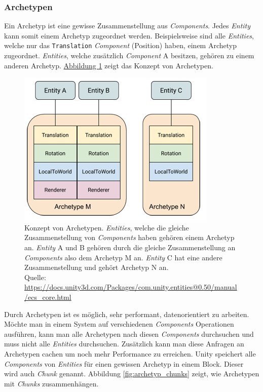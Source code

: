 \subsubsection[Archetypen]{Archetypen}
Ein Archetyp ist eine gewisse Zusammenstellung aus \textit{Components}. Jedes \textit{Entity} kann somit einem Archetyp zugeordnet werden. Beispielsweise sind alle \textit{Entities}, welche nur das \texttt{Translation} \textit{Component} (Position) haben, einem Archetyp zugeordnet. \textit{Entities}, welche zusätzlich \textit{Component} A besitzen, gehören zu einem anderen Archetyp. \hyperref[fig:archetype_concept]{Abbildung \ref*{fig:archetype_concept}} zeigt das Konzept von Archetypen.
\begin{figure}[H]
\begin{center}
\includegraphics[scale=0.66]{Bilder/ArchetypeConcept.png}
\caption[Konzept von Archetypen]{Konzept von Archetypen. \textit{Entities}, welche die gleiche Zusammenstellung von \textit{Components} haben gehören einem Archetyp an. \textit{Entity} A und B gehören durch die gleiche Zusammenstellung an \textit{Components} also dem Archetyp M an. \textit{Entity} C hat eine andere Zusammenstellung und gehört Archetyp N an.\\
\footnotesize{Quelle: \url{https://docs.unity3d.com/Packages/com.unity.entities@0.50/manual/ecs_core.html}}}
\label{fig:archetype_concept}
\end{center}
\end{figure}
Durch Archetypen ist es möglich, sehr performant, datenorientiert zu arbeiten. Möchte man in einem System auf verschiedenen \textit{Components} Operationen ausführen, kann man alle Archetypen nach diesen \textit{Components} durchsuchen und muss nicht alle \textit{Entities} durchsuchen. Zusätzlich kann man diese Anfragen an Archetypen cachen um noch mehr Performance zu erreichen. Unity speichert alle \textit{Components} von \textit{Entities} für einen gewissen Archetyp in einem Block. Dieser wird auch \textit{Chunk} genannt. Abbildung \ref{fig:archetyp_chunks} zeigt, wie Archetypen mit \textit{Chunks} zusammenhängen.
